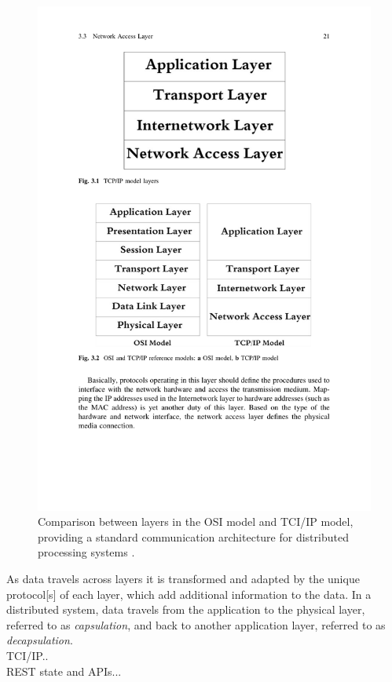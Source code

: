 \documentclass[../report.tex]{subfiles}
\begin{document}
\begin{figure}[h!]
\centering
\includegraphics[width=0.8\linewidth]{figures/ositcilayers.pdf}
\caption{Comparison between layers in the OSI model and TCI/IP model, providing a standard communication architecture for distributed processing systems \cite[21]{alani2014guide}.}
\label{fig:ositcilayers}
\end{figure}

As data travels across layers it is transformed and adapted by the unique protocol[s] of each layer, which add additional information to the data. In a distributed system, data travels from the application to the physical layer, referred to as \textit{capsulation}, and back to another application layer, referred to as \textit{decapsulation}. \\

TCI/IP.. \\

REST state and APIs...

\end{document}
